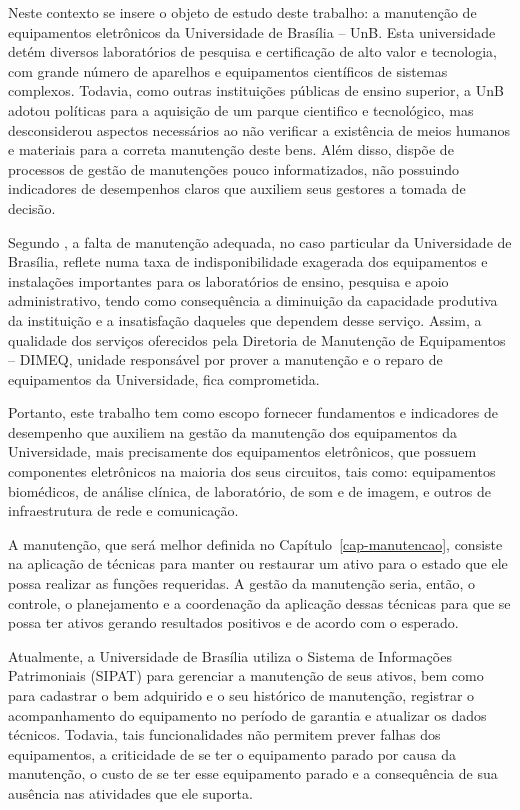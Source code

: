 Neste contexto se insere o objeto de estudo deste trabalho: a manutenção de equipamentos eletrônicos da Universidade de Brasília – UnB. Esta universidade detém diversos laboratórios de pesquisa e certificação de alto valor e tecnologia, com grande número de aparelhos e equipamentos científicos de sistemas complexos. Todavia, como outras instituições públicas de ensino superior, a UnB adotou políticas para a aquisição de um parque cientifico e tecnológico, mas desconsiderou aspectos necessários ao não verificar a existência de meios humanos e materiais para a correta manutenção deste bens. Além disso, dispõe de processos de gestão de manutenções pouco informatizados, não possuindo indicadores de desempenhos claros que auxiliem seus gestores a tomada de decisão.

Segundo \cite{limacastilho2006}, a falta de manutenção adequada, no caso particular da Universidade de Brasília,  reflete numa taxa de indisponibilidade exagerada dos equipamentos e instalações importantes para os laboratórios de ensino, pesquisa e apoio administrativo, tendo como consequência a diminuição da capacidade produtiva da instituição e a insatisfação daqueles que dependem desse serviço. Assim, a qualidade dos serviços oferecidos pela Diretoria de Manutenção de Equipamentos – DIMEQ, unidade responsável por prover a manutenção e o reparo de equipamentos da Universidade, fica comprometida. 

Portanto, este trabalho tem como escopo fornecer fundamentos e indicadores de desempenho que auxiliem na gestão da manutenção dos equipamentos da Universidade, mais precisamente dos equipamentos eletrônicos, que possuem componentes eletrônicos na maioria dos seus circuitos, tais como: equipamentos biomédicos, de análise clínica, de laboratório, de som e de imagem, e outros de infraestrutura de rede e comunicação.

A manutenção, que será melhor definida no Capítulo~\ref{cap-manutencao}, consiste na aplicação de técnicas para manter ou restaurar um ativo para o estado que ele possa realizar as funções requeridas. A gestão da manutenção seria, então, o controle, o planejamento e a coordenação da aplicação dessas técnicas para que se possa ter ativos gerando resultados positivos e de acordo com o esperado.

Atualmente, a Universidade de Brasília utiliza o Sistema de Informações Patrimoniais (SIPAT) para gerenciar a manutenção de seus ativos, bem como para cadastrar o bem adquirido e o seu histórico de manutenção, registrar o acompanhamento do equipamento no período de garantia e atualizar os dados técnicos. Todavia, tais funcionalidades não permitem prever falhas dos equipamentos, a criticidade de se ter o equipamento parado por causa da manutenção, o custo de se ter esse equipamento parado e a consequência de sua ausência nas atividades que ele suporta. 

